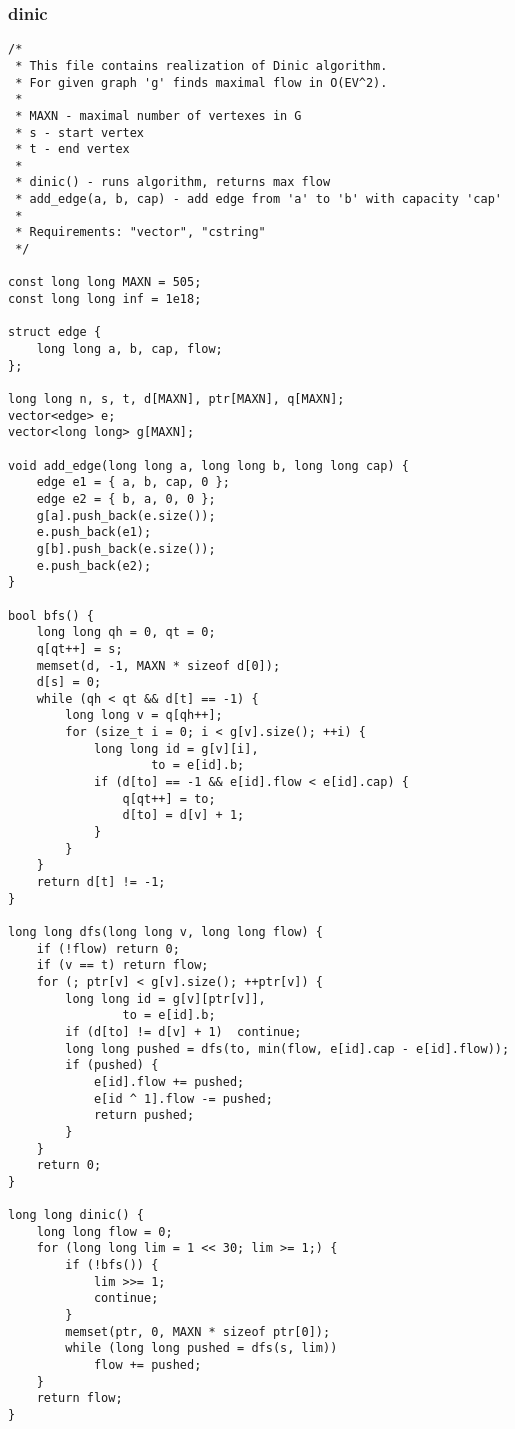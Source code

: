 \subsubsection{dinic}
\begin{lstlisting}
/*
 * This file contains realization of Dinic algorithm.
 * For given graph 'g' finds maximal flow in O(EV^2).
 *
 * MAXN - maximal number of vertexes in G
 * s - start vertex
 * t - end vertex
 *
 * dinic() - runs algorithm, returns max flow
 * add_edge(a, b, cap) - add edge from 'a' to 'b' with capacity 'cap'
 *
 * Requirements: "vector", "cstring"
 */

const long long MAXN = 505;
const long long inf = 1e18;

struct edge {
    long long a, b, cap, flow;
};

long long n, s, t, d[MAXN], ptr[MAXN], q[MAXN];
vector<edge> e;
vector<long long> g[MAXN];

void add_edge(long long a, long long b, long long cap) {
    edge e1 = { a, b, cap, 0 };
    edge e2 = { b, a, 0, 0 };
    g[a].push_back(e.size());
    e.push_back(e1);
    g[b].push_back(e.size());
    e.push_back(e2);
}

bool bfs() {
    long long qh = 0, qt = 0;
    q[qt++] = s;
    memset(d, -1, MAXN * sizeof d[0]);
    d[s] = 0;
    while (qh < qt && d[t] == -1) {
        long long v = q[qh++];
        for (size_t i = 0; i < g[v].size(); ++i) {
            long long id = g[v][i],
                    to = e[id].b;
            if (d[to] == -1 && e[id].flow < e[id].cap) {
                q[qt++] = to;
                d[to] = d[v] + 1;
            }
        }
    }
    return d[t] != -1;
}

long long dfs(long long v, long long flow) {
    if (!flow) return 0;
    if (v == t) return flow;
    for (; ptr[v] < g[v].size(); ++ptr[v]) {
        long long id = g[v][ptr[v]],
                to = e[id].b;
        if (d[to] != d[v] + 1)  continue;
        long long pushed = dfs(to, min(flow, e[id].cap - e[id].flow));
        if (pushed) {
            e[id].flow += pushed;
            e[id ^ 1].flow -= pushed;
            return pushed;
        }
    }
    return 0;
}

long long dinic() {
    long long flow = 0;
    for (long long lim = 1 << 30; lim >= 1;) {
        if (!bfs()) {
            lim >>= 1;
            continue;
        }
        memset(ptr, 0, MAXN * sizeof ptr[0]);
        while (long long pushed = dfs(s, lim))
            flow += pushed;
    }
    return flow;
}

\end{lstlisting}
